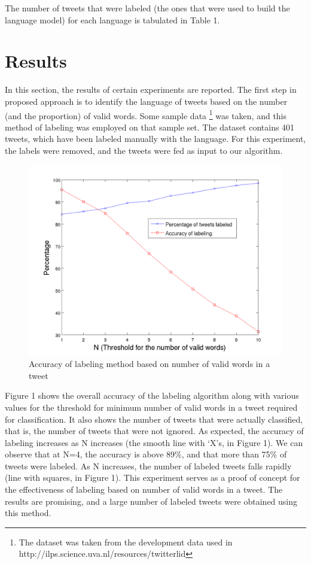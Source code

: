 \documentclass[11pt]{article}
\begin{document}
The number of tweets that were labeled (the ones that were used to build the language model) for each language is tabulated in Table 1.




\section{Results}
In this section, the results of certain experiments are reported. The first step in proposed approach is to identify the language of tweets based on the number (and the proportion) of valid words. Some sample data \footnote[3]{The dataset was taken from the development data used in http://ilps.science.uva.nl/resources/twitterlid} was taken, and this method of labeling was employed on that sample set. The dataset contains 401 tweets, which have been labeled manually with the language. For this experiment, the labels were removed, and the tweets were fed as input to our algorithm.

\begin{figure}[ht]
\includegraphics[scale=0.4]{accuracy_words.png}
\caption{\footnotesize Accuracy of labeling method based on number of valid words in a tweet}
\label{fig:s2}
\end{figure}


Figure 1 shows the overall accuracy of the labeling algorithm along with various values for the threshold for minimum number of valid words in a tweet required for classification. It also shows the number of tweets that were actually classified, that is, the number of tweets that were not ignored. As expected, the accuracy of labeling increases as N increases (the smooth line with `X's, in Figure 1). We can observe that at N=4, the accuracy is above 89\%, and that more than 75\% of tweets were labeled. As N increases, the number of labeled tweets falls rapidly (line with squares, in Figure 1). This experiment serves as a proof of concept for the effectiveness of labeling based on number of valid words in a tweet. The results are promising, and a large number of labeled tweets were obtained using this method.
\end{document}
